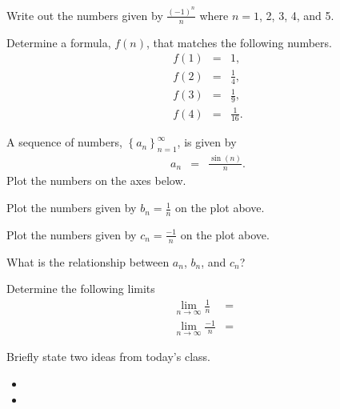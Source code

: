 
\begin{problem}
  \item Write out the numbers given by $\frac{(-1)^n}{n}$ where $n=1$,
    2, 3, 4, and 5.
    \vfill
  \item Determine a formula, $f(n)$, that matches the following
    numbers.
    \begin{eqnarray*}
      f(1) & = & 1, \\
      f(2) & = & \frac{1}{4}, \\
      f(3) & = & \frac{1}{9}, \\
      f(4) & = & \frac{1}{16}.
    \end{eqnarray*}
    \vfill
\end{problem}



\begin{problem}
\item A sequence of numbers, $\left\{ a_n \right\}_{n=1}^\infty$, is
  given by
  \begin{eqnarray*}
    a_n & = & \frac{\sin(n)}{n}.
  \end{eqnarray*}
  Plot the numbers on the axes below.

  \scalebox{0.75}{}

  \begin{subproblem}
  \item Plot the numbers given by $b_n=\frac{1}{n}$ on the plot
    above.
  \item Plot the numbers given by $c_n=\frac{-1}{n}$ on the plot
    above.
  \item What is the relationship between $a_n$, $b_n$, and $c_n$?
    \vfill
  \item Determine the following limits
    \begin{eqnarray*}
      \lim_{n\rightarrow\infty} \frac{1}{n} & = & \\
      \lim_{n\rightarrow\infty} \frac{-1}{n} & = & 
    \end{eqnarray*}
  \end{subproblem}
\end{problem}

\postClass

\begin{problem}
\item Briefly state two ideas from today's class.
  \begin{itemize}
  \item 
  \item 
  \end{itemize}
\item 
  \begin{subproblem}
    \item
  \end{subproblem}
\end{problem}


